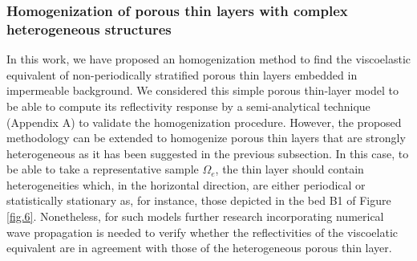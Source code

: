 \documentclass[draft]{agujournal2019}
\begin{document}
\subsubsection{Homogenization of porous thin layers with complex heterogeneous structures}
In this work, we have proposed an homogenization method to find the viscoelastic equivalent of non-periodically stratified porous thin layers embedded in impermeable background. We considered this simple porous thin-layer model to be able to compute its reflectivity response by a semi-analytical technique (Appendix A) to validate the homogenization procedure. However, the proposed methodology  can be extended to homogenize porous thin layers that are strongly heterogeneous as it has been suggested in the previous subsection. In this case, to be able to take a representative sample $\Omega_e$, the thin layer should contain heterogeneities which, in the horizontal direction, are either periodical or statistically stationary as, for instance, those depicted in the bed B1 of Figure \ref{fig.6}. Nonetheless, for such models further research incorporating numerical wave propagation is needed to verify whether the reflectivities of the viscoelatic equivalent are in agreement with those of the heterogeneous porous thin layer. 
\end{document}
